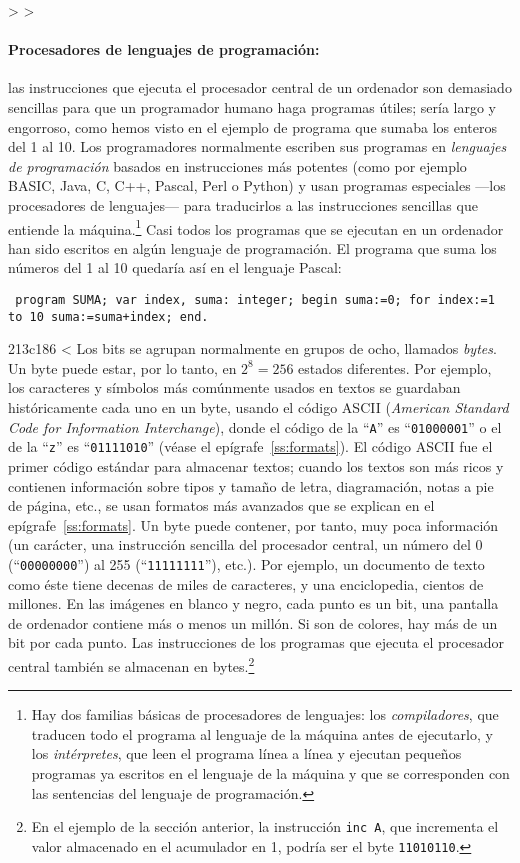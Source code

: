 > 
> \paragraph{Procesadores de lenguajes de programación:} las instrucciones que ejecuta el procesador central de un ordenador son demasiado sencillas para que un programador humano haga programas útiles; sería largo y engorroso, como hemos visto en el ejemplo de programa que sumaba los enteros del 1 al 10. Los programadores normalmente escriben sus programas en {\em lenguajes de programación} basados en instrucciones más potentes (como por ejemplo BASIC, Java, C, C++, Pascal, Perl o Python) y usan programas especiales ---los procesadores de lenguajes--- para traducirlos a las instrucciones sencillas que entiende la máquina.\footnote{Hay dos familias básicas de procesadores de lenguajes: los \emph{compiladores}, que traducen todo el programa al lenguaje de la máquina antes de ejecutarlo, y los \emph{intérpretes}, que leen el programa línea a línea y ejecutan pequeños programas ya escritos en el lenguaje de la máquina y que se corresponden con las sentencias del lenguaje de programación.} Casi todos los programas que se ejecutan en un ordenador han sido escritos en algún lenguaje de programación. El programa que suma los números del 1 al 10 quedaría así en el lenguaje Pascal: \begin{verbatim} program SUMA; var index, suma: integer; begin suma:=0; for index:=1 to 10 suma:=suma+index; end. \end{verbatim} 
213c186
< Los bits se agrupan normalmente en grupos de ocho, llamados \emph{bytes}. Un byte puede estar, por lo tanto, en $2^8=256$ estados diferentes. Por ejemplo, los caracteres y símbolos más comúnmente usados en textos se guardaban históricamente cada uno en un byte, usando el código ASCII\label{pg:ASCII} (\emph{American Standard Code for Information Interchange}), donde el código de la ``{\tt A}'' es ``{\tt 01000001}'' o el de la ``{\tt z}'' es ``{\tt 01111010}'' (véase el epígrafe~\ref{ss:formats}). El código ASCII fue el primer código estándar para almacenar textos; cuando los textos son más ricos y contienen información sobre tipos y tamaño de letra, diagramación, notas a pie de página, etc., se usan formatos más avanzados que se explican en el epígrafe~\ref{ss:formats}. Un byte puede contener, por tanto, muy poca información (un carácter, una instrucción sencilla del procesador central, un número del 0 (``{\tt 00000000}'') al 255 (``{\tt 11111111}''), etc.). Por ejemplo, un documento de texto como éste tiene decenas de miles de caracteres, y una enciclopedia, cientos de millones. En las imágenes en blanco y negro, cada punto es un bit, una pantalla de ordenador contiene más o menos un millón. Si son de colores, hay más de un bit por cada punto. Las instrucciones de los programas que ejecuta el procesador central también se almacenan en bytes.\footnote{En el ejemplo de la sección anterior, la instrucción {\tt inc A}, que incrementa el valor almacenado en el acumulador en 1, podría ser el byte {\tt 11010110}.} 
